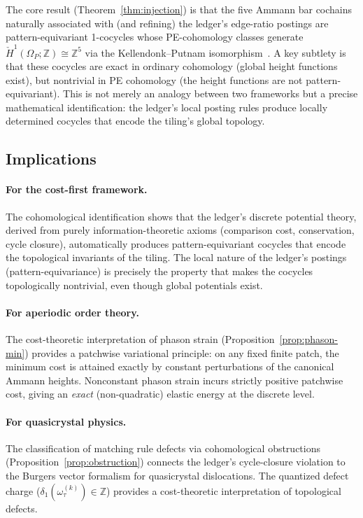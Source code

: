 \documentclass[12pt]{article}
\theoremstyle{definition}
\theoremstyle{remark}
\newcommand{\ZZ}{\mathbb{Z}}
\newcommand{\Hcech}{\check{H}}
\begin{document}
The core result (Theorem~\ref{thm:injection}) is that the five Ammann bar cochains naturally associated with (and refining) the ledger's edge-ratio postings are pattern-equivariant 1-cocycles whose PE-cohomology classes generate $\Hcech^1(\Omega_P; \ZZ) \cong \ZZ^5$ via the Kellendonk--Putnam isomorphism~\cite{KellendonkPutnam2006}. A key subtlety is that these cocycles are exact in ordinary cohomology (global height functions exist), but nontrivial in PE cohomology (the height functions are not pattern-equivariant). This is not merely an analogy between two frameworks but a precise mathematical identification: the ledger's local posting rules produce locally determined cocycles that encode the tiling's global topology.

\subsection{Implications}

\paragraph{For the cost-first framework.} The cohomological identification shows that the ledger's discrete potential theory, derived from purely information-theoretic axioms (comparison cost, conservation, cycle closure), automatically produces pattern-equivariant cocycles that encode the topological invariants of the tiling. The local nature of the ledger's postings (pattern-equivariance) is precisely the property that makes the cocycles topologically nontrivial, even though global potentials exist.

\paragraph{For aperiodic order theory.} The cost-theoretic interpretation of phason strain (Proposition~\ref{prop:phason-min}) provides a patchwise variational principle: on any fixed finite patch, the minimum cost is attained exactly by constant perturbations of the canonical Ammann heights. Nonconstant phason strain incurs strictly positive patchwise cost, giving an \emph{exact} (non-quadratic) elastic energy at the discrete level.

\paragraph{For quasicrystal physics.} The classification of matching rule defects via cohomological obstructions (Proposition~\ref{prop:obstruction}) connects the ledger's cycle-closure violation to the Burgers vector formalism for quasicrystal dislocations. The quantized defect charge ($\delta_1(\omega_\tau^{(k)}) \in \ZZ$) provides a cost-theoretic interpretation of topological defects.
\end{document}
